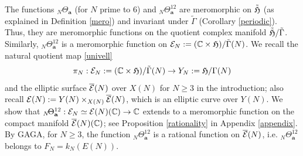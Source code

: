 \documentclass[12pt,amstex,amssymb]{article}
\theoremstyle{plain}
\theoremstyle{definition}
\newtheorem{remark}[theorem]{Remark}
\def\cE{{\cal E}}
\def\fH{{\frak H}}
\def\C{{\mathbb C}}
\newcommand{\be}{\begin{eqnarray*}}
\newcommand{\ee}{\end{eqnarray*}}
\newcommand{\ba}{\mathbf{a}}
\newcommand{\Spec}{\operatorname{Spec}}
\begin{document}
The functions $_{N}\!\Theta_\ba$ (for $N$ prime to 6) and $_{N}\!\Theta^{12}_\ba$ are meromorphic on $\tilde \fH$ (as explained in Definition \ref{mero}) and invariant under $\tilde \Gamma$ (Corollary \ref{periodic}).  Thus, they are meromorphic functions on the quotient complex manifold $\tilde \fH/\tilde \Gamma$. Similarly,  $_{N}\!\Theta^{12}_\ba$ is a meromorphic function on $\cE_N:=(\C \times \fH)/ \tilde \Gamma(N)$. 
We recall the natural quotient map \eqref{univell}
\be
\pi_N: \cE_N:=(\C \times \fH)/ \tilde \Gamma(N) \to Y_N:=\fH/\Gamma(N)
\ee
and the elliptic surface $\overline \cE(N)$ over $X(N)$ for $N\geq 3$ in the introduction; also recall $\cE(N):=Y(N)\times_{X(N)}\overline \cE(N)$, which is an elliptic curve over $Y(N)$.
We show that $_{N}\!\Theta^{12}_\ba:\cE_N\simeq \cE(N)(\C) \to \C$ extends to a meromorphic function on the compact manifold $\overline \cE(N)(\C)$; see Proposition \ref{rationality} in Appendix \ref{appendix}.
By GAGA,
for $N\geq 3$, the function $_{N}\!\Theta^{12}_\ba$ is a rational function on $\overline \cE(N)$, i.e. $_{N}\!\Theta^{12}_\ba$ belongs to $F_N=k_N(E(N))$.   
\end{document}
